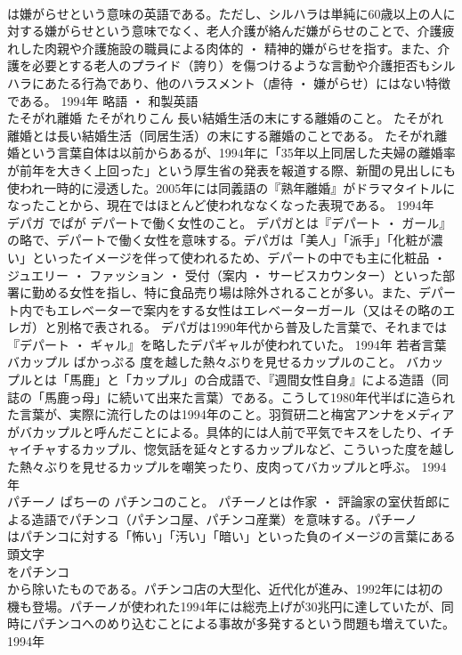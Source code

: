 \documentclass[8pt]{extreport}
\begin{document}
\begin{CJK}{UTF8}{min}
\\	は嫌がらせという意味の英語である。ただし、シルハラは単純に60歳以上の人に対する嫌がらせという意味でなく、老人介護が絡んだ嫌がらせのことで、介護疲れした肉親や介護施設の職員による肉体的 ・ 精神的嫌がらせを指す。また、介護を必要とする老人のプライド（誇り）を傷つけるような言動や介護拒否もシルハラにあたる行為であり、他のハラスメント（虐待 ・ 嫌がらせ）にはない特徴である。	1994年	略語 ・ 和製英語	
\\	たそがれ離婚	たそがれりこん	長い結婚生活の末にする離婚のこと。	たそがれ離婚とは長い結婚生活（同居生活）の末にする離婚のことである。 たそがれ離婚という言葉自体は以前からあるが、1994年に「35年以上同居した夫婦の離婚率が前年を大きく上回った」という厚生省の発表を報道する際、新聞の見出しにも使われ一時的に浸透した。2005年には同義語の『熟年離婚』がドラマタイトルになったことから、現在ではほとんど使われななくなった表現である。	1994年	
\\	デパガ	でぱが	デパートで働く女性のこと。	デパガとは『デパート ・ ガール』の略で、デパートで働く女性を意味する。デパガは「美人」「派手」「化粧が濃い」といったイメージを伴って使われるため、デパートの中でも主に化粧品 ・ ジュエリー ・ ファッション ・ 受付（案内 ・ サービスカウンター）といった部署に勤める女性を指し、特に食品売り場は除外されることが多い。また、デパート内でもエレベーターで案内をする女性はエレベーターガール（又はその略のエレガ）と別格で表される。 デパガは1990年代から普及した言葉で、それまでは『デパート ・ ギャル』を略したデパギャルが使われていた。	1994年	若者言葉	
\\	バカップル	ばかっぷる	度を越した熱々ぶりを見せるカップルのこと。	バカップルとは「馬鹿」と「カップル」の合成語で、『週間女性自身』による造語（同誌の「馬鹿っ母」に続いて出来た言葉）である。こうして1980年代半ばに造られた言葉が、実際に流行したのは1994年のこと。羽賀研二と梅宮アンナをメディアがバカップルと呼んだことによる。具体的には人前で平気でキスをしたり、イチャイチャするカップル、惚気話を延々とするカップルなど、こういった度を越した熱々ぶりを見せるカップルを嘲笑ったり、皮肉ってバカップルと呼ぶ。	1994年	
\\	パチーノ	ぱちーの	パチンコのこと。	パチーノとは作家 ・ 評論家の室伏哲郎による造語でパチンコ（パチンコ屋、パチンコ産業）を意味する。パチーノ
\\	はパチンコに対する「怖い」「汚い」「暗い」といった負のイメージの言葉にある頭文字
\\	をパチンコ
\\	から除いたものである。パチンコ店の大型化、近代化が進み、1992年には初の
\\	機も登場。パチーノが使われた1994年には総売上げが30兆円に達していたが、同時にパチンコへのめり込むことによる事故が多発するという問題も増えていた。	1994年	

\end{CJK}
\end{document}
